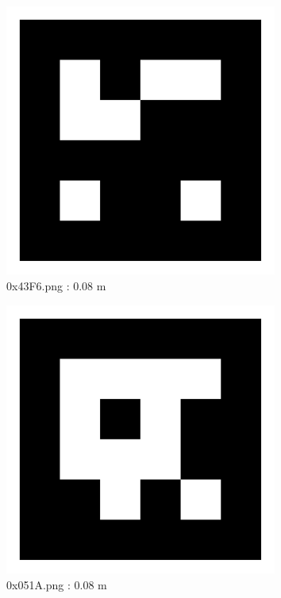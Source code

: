\documentclass[11pt,a4,BCOR=0cm]{scrartcl}
\begin{document}
\begin{figure}
  \centering
    \includegraphics[width=8.955cm]{0x43F6.pdf}
    \caption{0x43F6.png : 0.08 m}
    \label{fig:0x43F6.pdf}
  
\end{figure} 

\clearpage

\begin{figure}
  \centering
    \includegraphics[width=8.955cm]{0x051A.pdf}
    \caption{0x051A.png : 0.08 m}
    \label{fig:0x051A.pdf}
  
\end{figure} 
\end{document}
